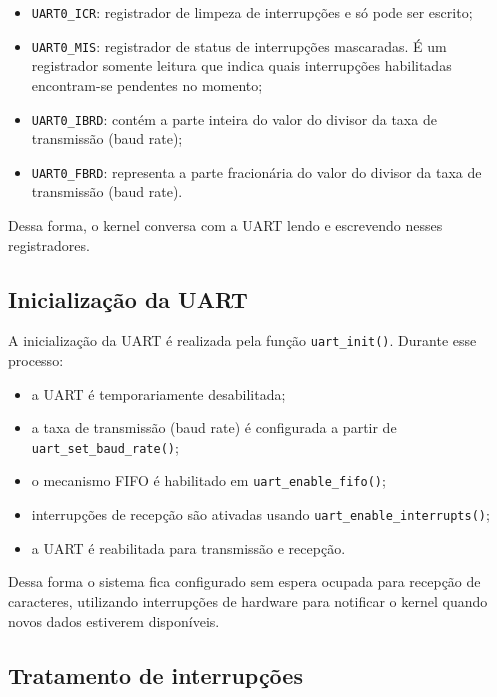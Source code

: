 \begin{itemize}
    \item \texttt{UART0\_ICR}: registrador de limpeza de interrupções e só pode ser escrito;
    
    \item \texttt{UART0\_MIS}: registrador de status de interrupções mascaradas. É um registrador somente leitura que indica quais interrupções habilitadas encontram-se pendentes no momento;
    
    \item \texttt{UART0\_IBRD}: contém a parte inteira do valor do divisor da taxa de transmissão (baud rate);
    
    \item \texttt{UART0\_FBRD}: representa a parte fracionária do valor do divisor da taxa de transmissão (baud rate).
\end{itemize}

Dessa forma, o kernel conversa com a UART lendo e escrevendo nesses registradores.

\subsection{Inicialização da UART}

A inicialização da UART é realizada pela função \texttt{uart\_init()}. Durante esse processo:

\begin{itemize}
    \item a UART é temporariamente desabilitada;
    
    \item a taxa de transmissão (baud rate) é configurada a partir de \texttt{uart\_set\_baud\_rate()};
    
    \item o mecanismo FIFO é habilitado em \texttt{uart\_enable\_fifo()};
    
    \item interrupções de recepção são ativadas usando \texttt{uart\_enable\_interrupts()};
    
    \item a UART é reabilitada para transmissão e recepção.
\end{itemize}

Dessa forma o sistema fica configurado sem espera ocupada para recepção de caracteres, utilizando interrupções de hardware para notificar o kernel quando novos dados estiverem disponíveis.

\subsection{Tratamento de interrupções}

